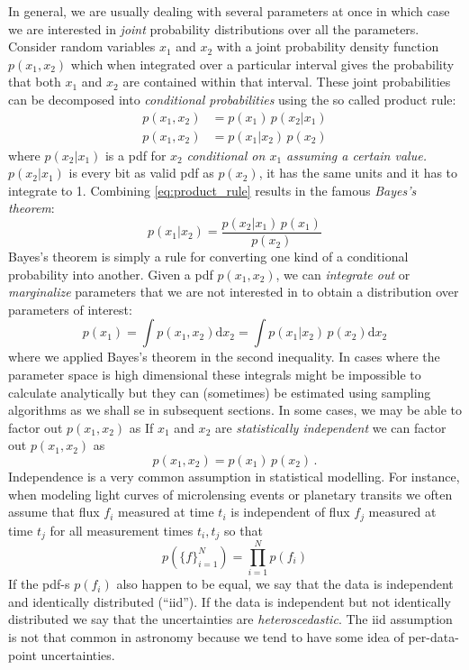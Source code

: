 \documentclass[12pt,dvipsnames]{report}
\begin{document}
In general, we are usually dealing with several parameters at once in which
case we are interested in \emph{joint} probability distributions over all the
parameters. Consider random variables $x_1$ and $x_2$ with a joint probability
density function $p(x_1,x_2)$ which when integrated over a particular interval
gives the probability that both $x_1$ and $x_2$ are contained within that
interval. These joint probabilities can be decomposed into \emph{conditional
    probabilities} using the so called product rule:
\begin{align}
    p(x_1,x_2) & =p(x_1)\,p(x_2\lvert x_1) \\
    p(x_1,x_2) & =p(x_1\lvert x_2)\,p(x_2)
    \label{eq:product_rule}
\end{align}
where $p(x_2\lvert x_1)$ is a pdf for $x_2$ \emph{conditional on
    $x_1$ assuming a certain value.} $p(x_2\lvert x_1)$ is every bit as
valid pdf as $p(x_2)$, it has the same units and it has to integrate to 1.
Combining \ref{eq:product_rule} results in the famous \emph{Bayes's theorem}:
\begin{equation}
    p(x_1\lvert x_2)= \frac{p(x_2\lvert x_1)\,p(x_1)}{p(x_2)}
    \label{eq:bayes_theorem}
\end{equation}
Bayes's theorem is simply a rule for converting one kind of a conditional probability
into another.
Given a pdf $p(x_1,x_2)$, we can \emph{integrate out} or
\emph{marginalize} parameters that we are not interested in to obtain a distribution over
parameters of interest:
\begin{equation}
    p(x_1)=\int p(x_1,x_2)\textrm{d}x_2=\int p(x_1\lvert
    x_2)\,p(x_2)\textrm{d}x_2
    \label{eq:marginalization}
\end{equation}
where we applied Bayes's theorem in the second inequality.
In cases where the parameter space is high dimensional these integrals might be
impossible to calculate analytically but they can (sometimes) be estimated using sampling
algorithms as we shall se in subsequent sections.
In some cases, we may be able to factor out $p(x_1,x_2)$ as
If $x_1$ and $x_2$ are \emph{statistically independent} we can factor out $p(x_1,x_2)$ as
\begin{equation}
    p(x_1,x_2)=p(x_1)\,p(x_2)\,.
\end{equation}
Independence is a very common assumption in statistical modelling. For instance, when modeling light curves
of microlensing events or planetary transits we often assume that flux $f_i$ measured at time $t_i$ is independent
of flux $f_j$ measured at time $t_j$  for all measurement times $t_i,t_j$ so that
\begin{equation}
    p(\{f\}_{i=1}^N)=\prod_{i=1}^Np(f_i)
    \label{eq:likelihood_indep}
\end{equation}
If the pdf-s $p(f_i)$ also happen to be equal, we say that the data is independent and
identically distributed (``iid''). If the data is independent but not identically distributed
we say that the uncertainties are \emph{heteroscedastic}.
The iid assumption is not that common in astronomy because we tend to have some idea of per-data-point
uncertainties.
\end{document}
